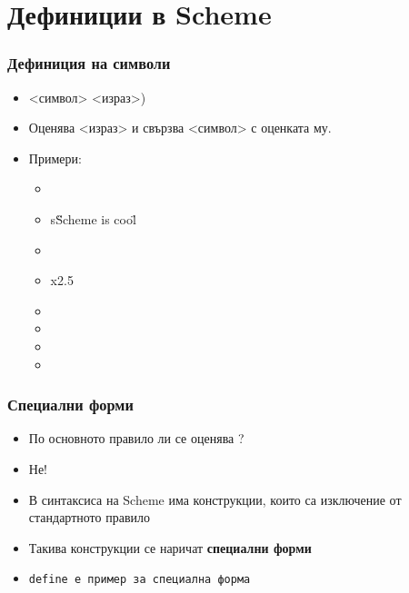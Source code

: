 \documentclass[alsotrans,beameroptions={aspectratio=169}]{beamerswitch}
\begin{document}
\section{Дефиниции в Scheme}

\begin{frame}
  \frametitle{Дефиниция на символи}

  \begin{itemize}[<+->]
  \item {} <символ> <израз>\tta)
  \item Оценява <израз> и свързва <символ> с оценката му.
  \item Примери:
    \begin{itemize}
    \item {}
    \item \evalsto s{\"Scheme is cool\"}
    \item {}
    \item \evalsto x{2.5}
    \item {}
    \item {}
    \item {}
    \item {}
    \end{itemize}
  \end{itemize}
\end{frame}

\begin{frame}
  \frametitle{Специални форми}

  \begin{itemize}[<+->]
  \item По основното правило ли се оценява ?
  \item \alert{Не!}
  \item В синтаксиса на Scheme има конструкции, които са изключение от стандартното правило
  \item Такива конструкции се наричат \textbf{специални форми}
  \item \tt{define} е пример за специална форма
  \end{itemize}
\end{frame}
\end{document}
